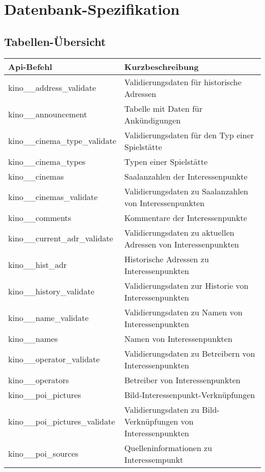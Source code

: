 \chapter{Datenbank-Spezifikation}
\section{Tabellen-Übersicht}
\begin{longtable}[H]{|l|p{9cm}|}
	\hline
	\textbf{Api-Befehl} 			& \textbf{Kurzbeschreibung}              \\ \hline
	kino\_\_address\_validate 		& Validierungsdaten für historische Adressen \\ \hline
	kino\_\_announcement            & Tabelle mit Daten für Ankündigungen \\ \hline
	kino\_\_cinema\_type\_validate	& Validierungsdaten für den Typ einer Spielstätte \\ \hline
	kino\_\_cinema\_types 			& Typen einer Spielstätte \\ \hline
	kino\_\_cinemas 				& Saalanzahlen der Interessenpunkte \\ \hline
	kino\_\_cinemas\_validate 		& Validierungsdaten zu Saalanzahlen von Interessenpunkten\\ \hline
	kino\_\_comments 				& Kommentare der Interessenpunkte \\ \hline
	kino\_\_current\_adr\_validate 	& Validierungsdaten zu aktuellen Adressen von Interessenpunkten \\ \hline
	kino\_\_hist\_adr 				& Historische Adressen zu Interessenpunkten \\ \hline
	kino\_\_history\_validate 		& Validierungsdaten zur Historie von Interessenpunkten \\ \hline
	kino\_\_name\_validate 			& Validierungsdaten zu Namen von Interessenpunkten \\ \hline
	kino\_\_names 					& Namen von Interessenpunkten \\ \hline
	kino\_\_operator\_validate 		& Validierungsdaten zu Betreibern von Interessenpunkten \\ \hline
	kino\_\_operators 				& Betreiber von Interessenpunkten \\ \hline
	kino\_\_poi\_pictures 			& Bild-Interessenpunkt-Verknüpfungen\\ \hline
	kino\_\_poi\_pictures\_validate & Validierungsdaten zu Bild-Verknüpfungen von Interessenpunkten \\ \hline
	kino\_\_poi\_sources            & Quelleninformationen zu Interessempunkt \\ \hline

\end{longtable}
